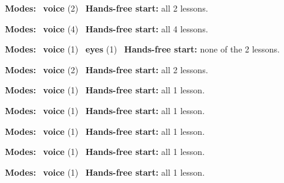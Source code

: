 \expandafter\def\csname hlchaptermodality15\endcsname{%
  {\small\noindent
    \textbf{Modes:} \hlvoicesign{}~\textbf{voice} (2)\quad
    \hlvoicesign{}~\textbf{Hands-free start:} all 2 lessons.%
    \par}\medskip
}

\expandafter\def\csname hlchaptermodality16\endcsname{%
  {\small\noindent
    \textbf{Modes:} \hlvoicesign{}~\textbf{voice} (4)\quad
    \hlvoicesign{}~\textbf{Hands-free start:} all 4 lessons.%
    \par}\medskip
}

\expandafter\def\csname hlchaptermodality17\endcsname{%
  {\small\noindent
    \textbf{Modes:} \hlvoicesign{}~\textbf{voice} (1) \quad \hlsightsign{}~\textbf{eyes} (1)\quad
    \hlvoicesign{}~\textbf{Hands-free start:} none of the 2 lessons.%
    \par}\medskip
}

\expandafter\def\csname hlchaptermodality18\endcsname{%
  {\small\noindent
    \textbf{Modes:} \hlvoicesign{}~\textbf{voice} (2)\quad
    \hlvoicesign{}~\textbf{Hands-free start:} all 2 lessons.%
    \par}\medskip
}

\expandafter\def\csname hlchaptermodality19\endcsname{%
  {\small\noindent
    \textbf{Modes:} \hlvoicesign{}~\textbf{voice} (1)\quad
    \hlvoicesign{}~\textbf{Hands-free start:} all 1 lesson.%
    \par}\medskip
}

\expandafter\def\csname hlchaptermodality20\endcsname{%
  {\small\noindent
    \textbf{Modes:} \hlvoicesign{}~\textbf{voice} (1)\quad
    \hlvoicesign{}~\textbf{Hands-free start:} all 1 lesson.%
    \par}\medskip
}

\expandafter\def\csname hlchaptermodality21\endcsname{%
  {\small\noindent
    \textbf{Modes:} \hlvoicesign{}~\textbf{voice} (1)\quad
    \hlvoicesign{}~\textbf{Hands-free start:} all 1 lesson.%
    \par}\medskip
}

\expandafter\def\csname hlchaptermodality22\endcsname{%
  {\small\noindent
    \textbf{Modes:} \hlvoicesign{}~\textbf{voice} (1)\quad
    \hlvoicesign{}~\textbf{Hands-free start:} all 1 lesson.%
    \par}\medskip
}

\expandafter\def\csname hlchaptermodality23\endcsname{%
  {\small\noindent
    \textbf{Modes:} \hlvoicesign{}~\textbf{voice} (1)\quad
    \hlvoicesign{}~\textbf{Hands-free start:} all 1 lesson.%
    \par}\medskip
}

